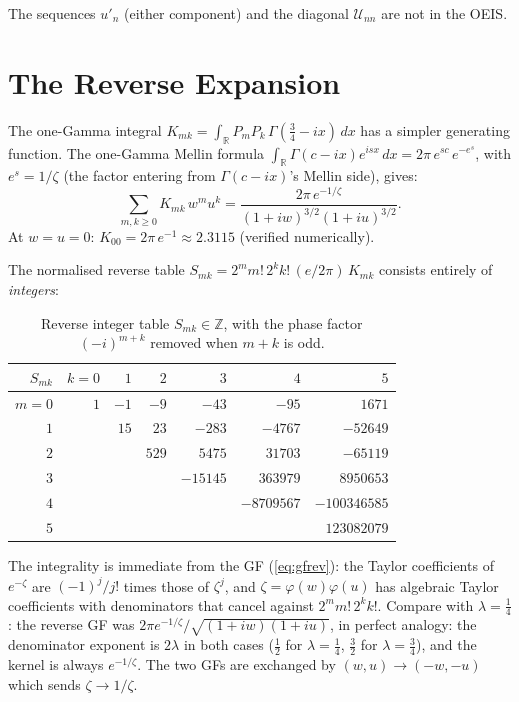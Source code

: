 \documentclass[11pt,a4paper]{article}
\newcommand{\R}{\mathbb{R}}
\newcommand{\Z}{\mathbb{Z}}
\begin{document}
The sequences $u'_n$ (either component) and the diagonal
$\mathcal{U}_{nn}$ are not in the OEIS.

\section{The Reverse Expansion}

The one-Gamma integral $K_{mk} = \int_\R P_m P_k\,\Gamma(\tfrac34-ix)\,dx$
has a simpler generating function. The one-Gamma Mellin formula
$\int_\R \Gamma(c-ix) e^{isx}\,dx = 2\pi\, e^{sc}\, e^{-e^s}$,
with $e^s = 1/\zeta$ (the factor entering from $\Gamma(c-ix)$'s Mellin side),
gives:
\begin{equation}\label{eq:gfrev}
  \sum_{m,k \ge 0} K_{mk}\,w^m u^k
  = \frac{2\pi\,e^{-1/\zeta}}{(1+iw)^{3/2}(1+iu)^{3/2}}.
\end{equation}
At $w=u=0$: $K_{00} = 2\pi\,e^{-1} \approx 2.3115$ (verified numerically).

The normalised reverse table $S_{mk} = 2^m m!\,2^k k!\,(e/2\pi)\,K_{mk}$
consists entirely of \emph{integers}:

\begin{table}[ht]
\centering
\small
\begin{tabular}{r|rrrrrr}
$S_{mk}$ & $k=0$ & $1$ & $2$ & $3$ & $4$ & $5$ \\
\hline
$m=0$ & $1$ & $-1$ & $-9$ & $-43$ & $-95$ & $1671$ \\
$1$ &  & $15$ & $23$ & $-283$ & $-4767$ & $-52649$ \\
$2$ &  &  & $529$ & $5475$ & $31703$ & $-65119$ \\
$3$ &  &  &  & $-15145$ & $363979$ & $8950653$ \\
$4$ &  &  &  &  & $-8709567$ & $-100346585$ \\
$5$ &  &  &  &  &  & $123082079$ \\
\end{tabular}
\caption{Reverse integer table $S_{mk} \in \Z$, with the phase factor
$(-i)^{m+k}$ removed when $m+k$ is odd.}
\label{tab:reverse}
\end{table}

The integrality is immediate from the GF (\ref{eq:gfrev}): the Taylor coefficients
of $e^{-\zeta}$ are $(-1)^j/j!$ times those of $\zeta^j$, and $\zeta = \varphi(w)\varphi(u)$
has algebraic Taylor coefficients with denominators that cancel against $2^m m!\,2^k k!$.
Compare with $\lambda = \tfrac14$: the reverse GF was $2\pi e^{-1/\zeta}/\sqrt{(1+iw)(1+iu)}$,
in perfect analogy: the denominator exponent is $2\lambda$ in both cases ($\tfrac12$ for
$\lambda = \tfrac14$, $\tfrac32$ for $\lambda = \tfrac34$), and the kernel is always
$e^{-1/\zeta}$. The two GFs are exchanged by $(w,u) \to (-w,-u)$ which sends $\zeta \to 1/\zeta$.
\end{document}
